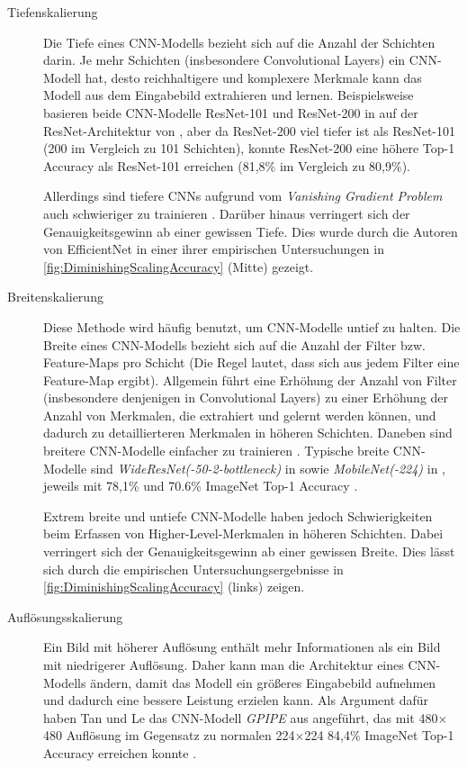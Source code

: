 \begin{description}
	\item[Tiefenskalierung] Die Tiefe eines CNN-Modells bezieht sich auf die Anzahl der Schichten darin. Je mehr Schichten (insbesondere Convolutional Layers) ein CNN-Modell hat, desto reichhaltigere und komplexere Merkmale kann das Modell aus dem Eingabebild extrahieren und lernen. Beispielsweise basieren beide CNN-Modelle ResNet-101 und ResNet-200 in \cite{cui2021parametric} auf der ResNet-Architektur von \cite{he2015deep}, aber da ResNet-200 viel tiefer ist als ResNet-101 (200 im Vergleich zu 101 Schichten), konnte ResNet-200 eine höhere Top-1 Accuracy als ResNet-101 erreichen (81,8\% im Vergleich zu 80,9\%).
	
	Allerdings sind tiefere CNNs aufgrund vom \emph{Vanishing Gradient Problem} auch schwieriger zu trainieren \cite{zagoruyko2017wide}. Darüber hinaus verringert sich der Genauigkeitsgewinn ab einer gewissen Tiefe. Dies wurde durch die Autoren von EfficientNet in einer ihrer empirischen Untersuchungen in \autoref{fig:DiminishingScalingAccuracy} (Mitte) gezeigt.
	
	\item[Breitenskalierung] Diese Methode wird häufig benutzt, um CNN-Modelle untief zu halten. Die Breite eines CNN-Modells bezieht sich auf die Anzahl der Filter bzw. Feature-Maps pro Schicht (Die Regel lautet, dass sich aus jedem Filter eine Feature-Map ergibt). Allgemein führt eine Erhöhung der Anzahl von Filter (insbesondere denjenigen in Convolutional Layers) zu einer Erhöhung der Anzahl von Merkmalen, die extrahiert und gelernt werden können, und dadurch zu detaillierteren Merkmalen in höheren Schichten. Daneben sind breitere CNN-Modelle einfacher zu trainieren \cite{zagoruyko2017wide}. Typische breite CNN-Modelle sind \emph{WideResNet(-50-2-bottleneck)} in \cite{zagoruyko2017wide} sowie \emph{MobileNet(-224)} in \cite{howard2017mobilenets}, jeweils mit 78,1\% und 70.6\% ImageNet Top-1 Accuracy \cite{PapersWithCode-ImageNet}.
	
	Extrem breite und untiefe CNN-Modelle haben jedoch Schwierigkeiten beim Erfassen von Higher-Level-Merkmalen in höheren Schichten. Dabei verringert sich der Genauigkeitsgewinn ab einer gewissen Breite. Dies lässt sich durch die empirischen Untersuchungsergebnisse in \autoref{fig:DiminishingScalingAccuracy} (links) zeigen.
	
	\item[Auflösungsskalierung] Ein Bild mit höherer Auflösung enthält mehr Informationen als ein Bild mit niedrigerer Auflösung. Daher kann man die Architektur eines CNN-Modells ändern, damit das Modell ein größeres Eingabebild aufnehmen und dadurch eine bessere Leistung erzielen kann.
	Als Argument dafür haben Tan und Le das CNN-Modell \emph{GPIPE} aus \cite{huang2019gpipe} angeführt, das mit 480$\times$480 Auflösung im Gegensatz zu normalen 224$\times$224 84,4\% ImageNet Top-1 Accuracy erreichen konnte \cite{PapersWithCode-ImageNet}.
	

\end{description}
